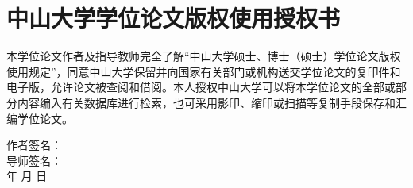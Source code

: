 \chapter{中山大学学位论文版权使用授权书}

本学位论文作者及指导教师完全了解“中山大学硕士、博士（硕士）学位论文版权使用规定”，同意中山大学保留并向国家有关部门或机构送交学位论文的复印件和电子版，允许论文被查阅和借阅。本人授权中山大学可以将本学位论文的全部或部分内容编入有关数据库进行检索，也可采用影印、缩印或扫描等复制手段保存和汇编学位论文。

\vskip 108pt
\begin{flushright}
	作者签名：\makebox[2.5cm]{} \\
	导师签名：\makebox[2.5cm]{} \\
	\quad \quad 年 \quad \quad 月 \quad \quad 日
\end{flushright}